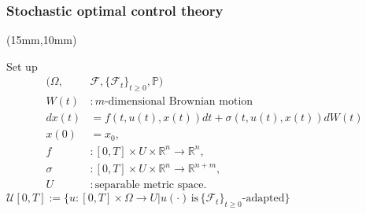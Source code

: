 \begin{frame}[plain]
    \frametitle{Stochastic optimal control theory}
    \begin{textblock*}{100mm}(15mm,10mm)
        \begin{graybox}{Set up}
            \begin{align*}
                (\Omega, & \mathcal{F}, \{\mathcal{F}_t\}_{t\geq 0}, \mathbb{P})
                \\
                W(t)&: m\text{-dimensional Brownian motion}
                \\
                dx(t)&=
                    f(t,u(t),x(t))dt+\sigma(t,u(t),x(t))dW(t)\\
                x(0)&=x_0,
                \\
                f &:
                    [0,T]\times U \times \mathbb{R}^n 
                    \to \mathbb{R}^n, 
                \\
                \sigma &: [0,T]\times U \times \mathbb{R}^n
                \to\mathbb{R}^{n+m},
                \\
                U &: \text{separable metric space}.
            \end{align*}
            \tcblower
            $
                \mathcal{U}[0,T]:=
                    \{
                        u:[0,T]\times\Omega 
                        \to U |
                         u(\cdot)\, 
                         \text{is}\, 
                         \{\mathcal{F}_t\}_{t\geq 0}\text{-adapted}
                    \}
            $
        \end{graybox}
    \end{textblock*}
\end{frame}

